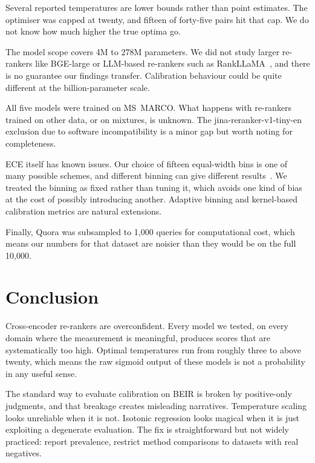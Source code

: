 Several reported temperatures are lower bounds rather than point estimates. The
optimiser was capped at twenty, and fifteen of forty-five pairs hit that cap. We
do not know how much higher the true optima go.

The model scope covers 4M to 278M parameters. We did not study larger re-rankers
like BGE-large or LLM-based re-rankers such as RankLLaMA~\cite{ma2024rankllama}, and
there is no guarantee our findings transfer. Calibration behaviour could be quite
different at the billion-parameter scale.

All five models were trained on MS~MARCO. What happens with re-rankers trained on
other data, or on mixtures, is unknown. The jina-reranker-v1-tiny-en exclusion due
to software incompatibility is a minor gap but worth noting for completeness.

ECE itself has known issues. Our choice of fifteen equal-width bins is one of many
possible schemes, and different binning can give different
results~\cite{nixon2019}. We treated the binning as fixed rather than tuning it,
which avoids one kind of bias at the cost of possibly introducing another. Adaptive
binning and kernel-based calibration metrics are natural extensions.

Finally, Quora was subsampled to 1{,}000 queries for computational cost, which means
our numbers for that dataset are noisier than they would be on the full 10{,}000.

\section{Conclusion}
\label{sec:conclusion}

Cross-encoder re-rankers are overconfident. Every model we tested, on every domain
where the measurement is meaningful, produces scores that are systematically too
high. Optimal temperatures run from roughly three to above twenty, which means the
raw sigmoid output of these models is not a probability in any useful sense.

The standard way to evaluate calibration on BEIR is broken by positive-only
judgments, and that breakage creates misleading narratives. Temperature scaling
looks unreliable when it is not. Isotonic regression looks magical when it is just
exploiting a degenerate evaluation. The fix is straightforward but not widely
practiced: report prevalence, restrict method comparisons to datasets with real
negatives.

